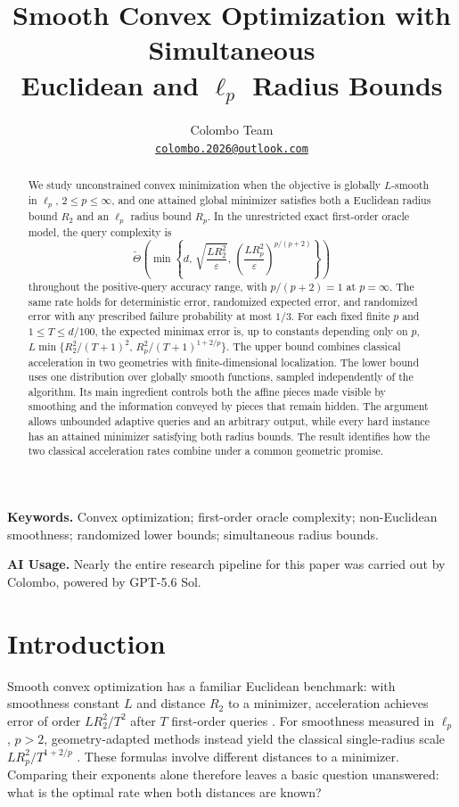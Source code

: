 \documentclass[11pt]{article}
\title{Smooth Convex Optimization with Simultaneous\\Euclidean and $\ell_p$ Radius Bounds}
\author{Colombo Team\\[3pt]\small\href{mailto:colombo.2026@outlook.com}{\texttt{colombo.2026@outlook.com}}}
\date{}
\newcommand{\eps}{\varepsilon}
\theoremstyle{definition}
\theoremstyle{remark}
\begin{document}
\maketitle
\begin{abstract}
We study unconstrained convex minimization when the objective is globally
$L$-smooth in $\ell_p$, $2\le p\le\infty$, and one attained global minimizer
satisfies both a Euclidean radius bound $R_2$ and an $\ell_p$ radius bound
$R_p$. In the unrestricted exact first-order oracle model, the query
complexity is
\[
\widetilde\Theta\!\left(\min\left\{d,\,
\sqrt{\frac{LR_2^2}{\eps}},\,
\left(\frac{LR_p^2}{\eps}\right)^{p/(p+2)}\right\}\right)
\]
throughout the positive-query accuracy range, with $p/(p+2)=1$ at
$p=\infty$. The same rate holds for deterministic error, randomized
expected error, and randomized error with any prescribed failure
probability at most $1/3$. For each fixed finite $p$ and $1\le T\le d/100$,
the expected minimax error is, up to constants depending only on $p$,
$L\min\{R_2^2/(T+1)^2,\,R_p^2/(T+1)^{1+2/p}\}$.
The upper bound combines classical acceleration in two geometries with
finite-dimensional localization. The lower bound uses one distribution
over globally smooth functions, sampled independently of the algorithm.
Its main ingredient controls both the affine pieces made visible by
smoothing and the information conveyed by pieces that remain hidden.
The argument allows unbounded adaptive queries and an arbitrary output,
while every hard instance has an attained minimizer satisfying both
radius bounds. The result identifies how the two classical acceleration
rates combine under a common geometric promise.
\end{abstract}

\noindent\textbf{Keywords.} Convex optimization; first-order oracle complexity;
non-Euclidean smoothness; randomized lower bounds; simultaneous radius bounds.
\par
\medskip
\begin{samepage}
\noindent\textbf{AI Usage.}
Nearly the entire research pipeline for this paper was carried out by
Colombo, powered by GPT-5.6 Sol. 
\par
\end{samepage}


\section{Introduction}
\label{sec:introduction}

Smooth convex optimization has a familiar Euclidean benchmark: with
smoothness constant $L$ and distance $R_2$ to a minimizer, acceleration
achieves error of order $LR_2^2/T^2$ after $T$ first-order queries
\citep{Nesterov1983,NemirovskiiNesterov1985}. For smoothness measured in
$\ell_p$, $p>2$, geometry-adapted methods instead yield the classical
single-radius scale $LR_p^2/T^{1+2/p}$
\citep{GuzmanNemirovski2015,dAspremontGuzmanJaggi2018}.
These formulas involve different distances to a minimizer. Comparing
their exponents alone therefore leaves a basic question unanswered:
what is the optimal rate when both distances are known?
\end{document}
